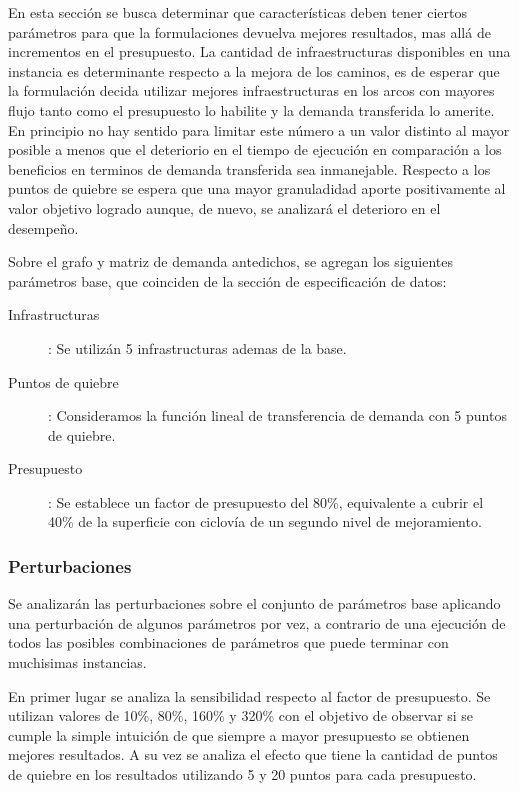 \documentclass{article}
\begin{document}
  En esta sección se busca determinar que características deben tener ciertos parámetros para que la formulaciones devuelva mejores resultados, mas allá de incrementos en el presupuesto. La cantidad de infraestructuras disponibles en una instancia es determinante respecto a la mejora de los caminos, es de esperar que la formulación decida utilizar mejores infraestructuras en los arcos con mayores flujo tanto como el presupuesto lo habilite y la demanda transferida lo amerite. En principio no hay sentido para limitar este número a un valor distinto al mayor posible a menos que el deteriorio en el tiempo de ejecución en comparación a los beneficios en terminos de demanda transferida sea inmanejable. Respecto a los puntos de quiebre se espera que una mayor granuladidad aporte positivamente al valor objetivo logrado aunque, de nuevo, se analizará el deterioro en el desempeño.

  Sobre el grafo y matriz de demanda antedichos, se agregan los siguientes parámetros base, que coinciden de la sección de especificación de datos:

  \begin{description}
    \item[Infrastructuras]: Se utilizán 5 infrastructuras ademas de la base.
    \item[Puntos de quiebre]: Consideramos la función lineal de transferencia de demanda con 5 puntos de quiebre.
    \item[Presupuesto]: Se establece un factor de presupuesto del 80\%, equivalente a cubrir el 40\% de la superficie con ciclovía de un segundo nivel de mejoramiento.
  \end{description}

  \subsubsection*{Perturbaciones}

  Se analizarán las perturbaciones sobre el conjunto de parámetros base aplicando una perturbación de algunos parámetros por vez, a contrario de una ejecución de todos las posibles combinaciones de parámetros que puede terminar con muchisimas instancias.

  En primer lugar se analiza la sensibilidad respecto al factor de presupuesto. Se utilizan valores de 10\%, 80\%, 160\% y 320\% con el objetivo de observar si se cumple la simple intuición de que siempre a mayor presupuesto se obtienen mejores resultados. A su vez se analiza el efecto que tiene la cantidad de puntos de quiebre en los resultados utilizando 5 y 20 puntos para cada presupuesto.
\end{document}
